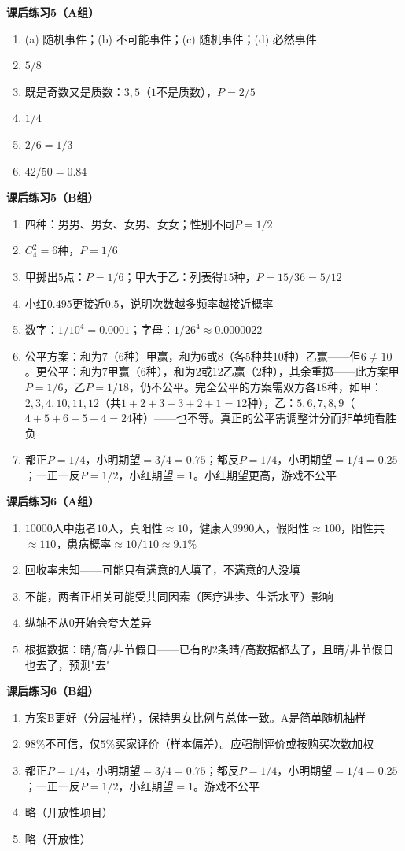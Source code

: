 \textbf{课后练习5（A组）}
\begin{enumerate}
\item (a) 随机事件；(b) 不可能事件；(c) 随机事件；(d) 必然事件
\item $5/8$
\item 既是奇数又是质数：$3,5$（$1$不是质数），$P=2/5$
\item $1/4$
\item $2/6=1/3$
\item $42/50=0.84$
\end{enumerate}

\textbf{课后练习5（B组）}
\begin{enumerate}
\item 四种：男男、男女、女男、女女；性别不同$P=1/2$
\item $C_4^2=6$种，$P=1/6$
\item 甲掷出$5$点：$P=1/6$；甲大于乙：列表得$15$种，$P=15/36=5/12$
\item 小红$0.495$更接近$0.5$，说明次数越多频率越接近概率
\item 数字：$1/10^4=0.0001$；字母：$1/26^4\approx0.0000022$
\item 公平方案：和为$7$（$6$种）甲赢，和为$6$或$8$（各$5$种共$10$种）乙赢——但$6\neq10$。更公平：和为$7$甲赢（$6$种），和为$2$或$12$乙赢（$2$种），其余重掷——此方案甲$P=1/6$，乙$P=1/18$，仍不公平。完全公平的方案需双方各$18$种，如甲：$2,3,4,10,11,12$（共$1+2+3+3+2+1=12$种），乙：$5,6,7,8,9$（$4+5+6+5+4=24$种）——也不等。真正的公平需调整计分而非单纯看胜负
\item 都正$P=1/4$，小明期望$=3/4=0.75$；都反$P=1/4$，小明期望$=1/4=0.25$；一正一反$P=1/2$，小红期望$=1$。小红期望更高，游戏不公平
\end{enumerate}

\textbf{课后练习6（A组）}
\begin{enumerate}
\item $10000$人中患者$10$人，真阳性$\approx10$，健康人$9990$人，假阳性$\approx100$，阳性共$\approx110$，患病概率$\approx10/110\approx9.1\%$
\item 回收率未知——可能只有满意的人填了，不满意的人没填
\item 不能，两者正相关可能受共同因素（医疗进步、生活水平）影响
\item 纵轴不从$0$开始会夸大差异
\item 根据数据：晴/高/非节假日——已有的$2$条晴/高数据都去了，且晴/非节假日也去了，预测"去"
\end{enumerate}

\textbf{课后练习6（B组）}
\begin{enumerate}
\item 方案B更好（分层抽样），保持男女比例与总体一致。A是简单随机抽样
\item $98\%$不可信，仅$5\%$买家评价（样本偏差）。应强制评价或按购买次数加权
\item 都正$P=1/4$，小明期望$=3/4=0.75$；都反$P=1/4$，小明期望$=1/4=0.25$；一正一反$P=1/2$，小红期望$=1$。游戏不公平
\item 略（开放性项目）
\item 略（开放性）
\end{enumerate}
